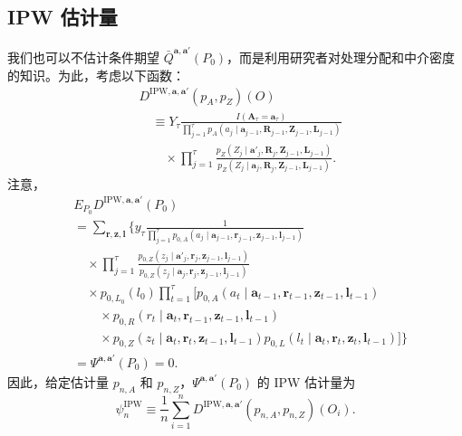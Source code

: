 \subsection{IPW 估计量}

我们也可以不估计条件期望 $\bar Q^{\mathbf a,\mathbf a'}(P_0)$，而是利用研究者对处理分配和中介密度的知识。为此，考虑以下函数：
\begin{equation}
\begin{aligned}
 &D^{\mathrm{IPW},\mathbf a,\mathbf a'}(p_A,p_Z)(O)\\
 &\quad\equiv Y_\tau
 \frac{I(\mathbf A_\tau=\mathbf a_\tau)}
 {\prod_{j=1}^\tau p_A(a_j\mid\mathbf a_{j-1},\mathbf R_{j-1},\mathbf Z_{j-1},\mathbf L_{j-1})}\\
 &\qquad{}\times\prod_{j=1}^\tau
 \frac{p_Z(Z_j\mid\mathbf a'_j,\mathbf R_j,\mathbf Z_{j-1},\mathbf L_{j-1})}
 {p_Z(Z_j\mid\mathbf a_j,\mathbf R_j,\mathbf Z_{j-1},\mathbf L_{j-1})}.
\end{aligned}
\tag{17.15}
\end{equation}
注意，
\[
\begin{aligned}
 &E_{P_0}D^{\mathrm{IPW},\mathbf a,\mathbf a'}(P_0)\\
 &=\sum_{\mathbf r,\mathbf z,\mathbf l}\biggl\{y_\tau
 \frac1{\prod_{j=1}^\tau p_{0,A}(a_j\mid\mathbf a_{j-1},\mathbf r_{j-1},\mathbf z_{j-1},\mathbf l_{j-1})}\\
 &\quad{}\times\prod_{j=1}^\tau
 \frac{p_{0,Z}(z_j\mid\mathbf a'_j,\mathbf r_j,\mathbf z_{j-1},\mathbf l_{j-1})}
 {p_{0,Z}(z_j\mid\mathbf a_j,\mathbf r_j,\mathbf z_{j-1},\mathbf l_{j-1})}\\
 &\quad{}\times p_{0,L_0}(l_0)\prod_{t=1}^\tau
 \bigl[p_{0,A}(a_t\mid\mathbf a_{t-1},\mathbf r_{t-1},\mathbf z_{t-1},\mathbf l_{t-1})\\
 &\qquad{}\times p_{0,R}(r_t\mid\mathbf a_t,\mathbf r_{t-1},\mathbf z_{t-1},\mathbf l_{t-1})\\
 &\qquad{}\times p_{0,Z}(z_t\mid\mathbf a_t,\mathbf r_t,\mathbf z_{t-1},\mathbf l_{t-1})
 p_{0,L}(l_t\mid\mathbf a_t,\mathbf r_t,\mathbf z_t,\mathbf l_{t-1})\bigr]\biggr\}\\
 &=\Psi^{\mathbf a,\mathbf a'}(P_0)=0.
\end{aligned}
\]
因此，给定估计量 $p_{n,A}$ 和 $p_{n,Z}$，$\Psi^{\mathbf a,\mathbf a'}(P_0)$ 的 IPW 估计量为
\begin{equation}
 \psi_n^{\mathrm{IPW}}\equiv\frac1n\sum_{i=1}^n
 D^{\mathrm{IPW},\mathbf a,\mathbf a'}(p_{n,A},p_{n,Z})(O_i).
 \tag{17.16}
\end{equation}

